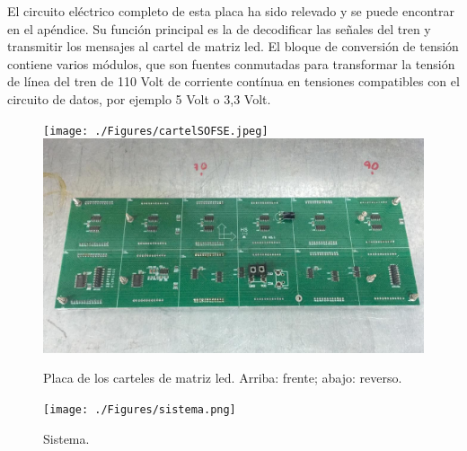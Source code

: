El circuito eléctrico completo de esta placa ha sido relevado y se puede encontrar en el apéndice. Su función principal es la de decodificar las señales del tren y transmitir los mensajes al cartel de matriz led. El bloque de conversión de tensión contiene varios módulos, que son fuentes conmutadas para transformar la tensión de línea del tren de 110 Volt de corriente contínua en tensiones compatibles con el circuito de datos, por ejemplo 5 Volt o 3,3 Volt.\\


\begin{figure}[H]
	\centering
	\texttt{[image: ./Figures/cartelSOFSE.jpeg]}
	\includegraphics[width=1\textwidth]{./Figures/cartel2x6.jpeg}
	\caption{Placa de los carteles de matriz led. Arriba: frente; abajo: reverso.}
	\label{fig:placaDisplay}
\end{figure}


\begin{figure}[H]
	\centering
	\texttt{[image: ./Figures/sistema.png]}
	\caption{Sistema.}
	\label{fig:sistema}
\end{figure}


